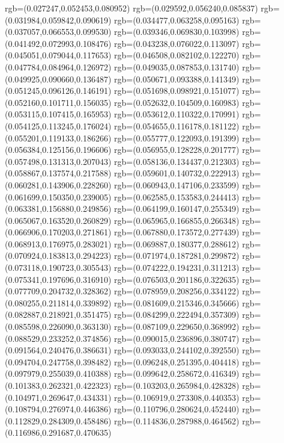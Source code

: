 {{{			rgb=(0.027247,0.052453,0.080952)
			rgb=(0.029592,0.056240,0.085837)
			rgb=(0.031984,0.059842,0.090619)
			rgb=(0.034477,0.063258,0.095163)
			rgb=(0.037057,0.066553,0.099530)
			rgb=(0.039346,0.069830,0.103998)
			rgb=(0.041492,0.072993,0.108476)
			rgb=(0.043238,0.076022,0.113097)
			rgb=(0.045051,0.079044,0.117653)
			rgb=(0.046508,0.082102,0.122270)
			rgb=(0.047784,0.084964,0.126972)
			rgb=(0.049035,0.087853,0.131740)
			rgb=(0.049925,0.090660,0.136487)
			rgb=(0.050671,0.093388,0.141349)
			rgb=(0.051245,0.096126,0.146191)
			rgb=(0.051698,0.098921,0.151077)
			rgb=(0.052160,0.101711,0.156035)
			rgb=(0.052632,0.104509,0.160983)
			rgb=(0.053115,0.107415,0.165953)
			rgb=(0.053612,0.110322,0.170991)
			rgb=(0.054125,0.113245,0.176024)
			rgb=(0.054655,0.116178,0.181122)
			rgb=(0.055201,0.119133,0.186266)
			rgb=(0.055777,0.122093,0.191399)
			rgb=(0.056384,0.125156,0.196606)
			rgb=(0.056955,0.128228,0.201777)
			rgb=(0.057498,0.131313,0.207043)
			rgb=(0.058136,0.134437,0.212303)
			rgb=(0.058867,0.137574,0.217588)
			rgb=(0.059601,0.140732,0.222913)
			rgb=(0.060281,0.143906,0.228260)
			rgb=(0.060943,0.147106,0.233599)
			rgb=(0.061699,0.150350,0.239005)
			rgb=(0.062585,0.153583,0.244413)
			rgb=(0.063381,0.156880,0.249856)
			rgb=(0.064199,0.160147,0.255349)
			rgb=(0.065067,0.163520,0.260829)
			rgb=(0.065965,0.166855,0.266348)
			rgb=(0.066906,0.170203,0.271861)
			rgb=(0.067880,0.173572,0.277439)
			rgb=(0.068913,0.176975,0.283021)
			rgb=(0.069887,0.180377,0.288612)
			rgb=(0.070924,0.183813,0.294223)
			rgb=(0.071974,0.187281,0.299872)
			rgb=(0.073118,0.190723,0.305543)
			rgb=(0.074222,0.194231,0.311213)
			rgb=(0.075341,0.197696,0.316910)
			rgb=(0.076503,0.201186,0.322635)
			rgb=(0.077709,0.204732,0.328362)
			rgb=(0.078959,0.208256,0.334122)
			rgb=(0.080255,0.211814,0.339892)
			rgb=(0.081609,0.215346,0.345666)
			rgb=(0.082887,0.218921,0.351475)
			rgb=(0.084299,0.222494,0.357309)
			rgb=(0.085598,0.226090,0.363130)
			rgb=(0.087109,0.229650,0.368992)
			rgb=(0.088529,0.233252,0.374856)
			rgb=(0.090015,0.236896,0.380747)
			rgb=(0.091564,0.240476,0.386631)
			rgb=(0.093033,0.244102,0.392550)
			rgb=(0.094704,0.247758,0.398482)
			rgb=(0.096248,0.251395,0.404418)
			rgb=(0.097979,0.255039,0.410388)
			rgb=(0.099642,0.258672,0.416349)
			rgb=(0.101383,0.262321,0.422323)
			rgb=(0.103203,0.265984,0.428328)
			rgb=(0.104971,0.269647,0.434331)
			rgb=(0.106919,0.273308,0.440353)
			rgb=(0.108794,0.276974,0.446386)
			rgb=(0.110796,0.280624,0.452440)
			rgb=(0.112829,0.284309,0.458486)
			rgb=(0.114836,0.287988,0.464562)
			rgb=(0.116986,0.291687,0.470635)
}}}
